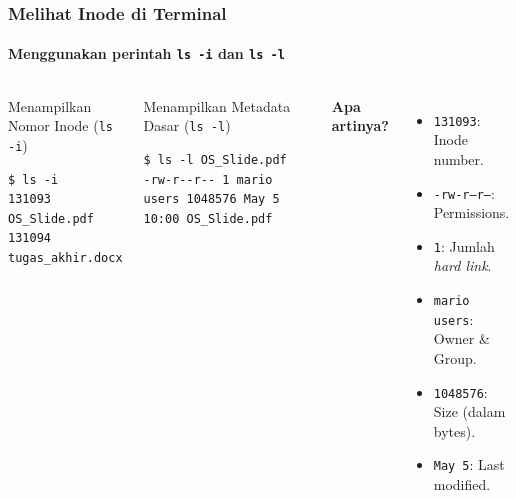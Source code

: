 \documentclass[t,aspectratio=169,xcolor=dvipsnames]{beamer}
\begin{document}
\begin{frame}[fragile]
    \frametitle{Melihat Inode di Terminal}
    \framesubtitle{Menggunakan perintah \texttt{ls -i} dan \texttt{ls -l}}
    \small

    \begin{columns}[T]
        \begin{block}{Menampilkan Nomor Inode (\texttt{ls -i})}
\begin{lstlisting}[basicstyle=\ttfamily\scriptsize]
$ ls -i
131093 OS_Slide.pdf
131094 tugas_akhir.docx
\end{lstlisting}
        \end{block}

        \begin{block}{Menampilkan Metadata Dasar (\texttt{ls -l})}
\begin{lstlisting}[basicstyle=\ttfamily\scriptsize]
$ ls -l OS_Slide.pdf
-rw-r--r-- 1 mario users 1048576 May 5 10:00 OS_Slide.pdf
\end{lstlisting}
        \end{block}

        \textbf{Apa artinya?}
        \begin{itemize}
            \item \texttt{131093}: Inode number.
            \item \texttt{-rw-r--r--}: Permissions.
            \item \texttt{1}: Jumlah \textit{hard link}.
            \item \texttt{mario users}: Owner \& Group.
            \item \texttt{1048576}: Size (dalam bytes).
            \item \texttt{May 5}: Last modified.
        \end{itemize}
    \end{columns}
\end{frame}
\end{document}
